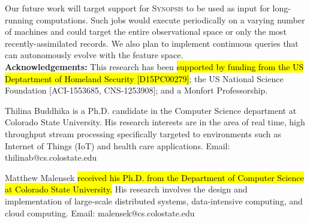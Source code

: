 \documentclass[9pt,journal,compsoc]{IEEEtran}
\begin{document}
Our future work will target support for \textsc{Synopsis} to be used as input for long-running computations. Such jobs would execute periodically on a varying number of machines and could target the entire observational space or only the most recently-assimilated records. We also plan to implement continuous queries that can autonomously evolve with the feature space.
\vspace{1em}\\
%
%
\textbf{Acknowledgements:}
This research has been \hl{supported by funding from the US Deptartment of Homeland Security [D15PC00279]}; the US National Science Foundation [ACI-1553685, CNS-1253908]; and a Monfort Professorship.



\vspace*{-3.7\baselineskip}
\begin{IEEEbiography}{Thilina Buddhika} is a Ph.D. candidate in the Computer Science department at Colorado State University.  His research interests are in the area of real time, high throughput stream processing specifically targeted to environments such as Internet of Things (IoT) and health care applications. Email: thilinab@cs.colostate.edu
\end{IEEEbiography}
\vspace{-1.60cm}
\begin{IEEEbiography}{Matthew Malensek} \hl{received his Ph.D. from the Department of Computer Science at Colorado State University.} His research involves the design and implementation of large-scale distributed systems, data-intensive computing, and cloud computing. Email: malensek@cs.colostate.edu
\end{IEEEbiography}
\end{document}
